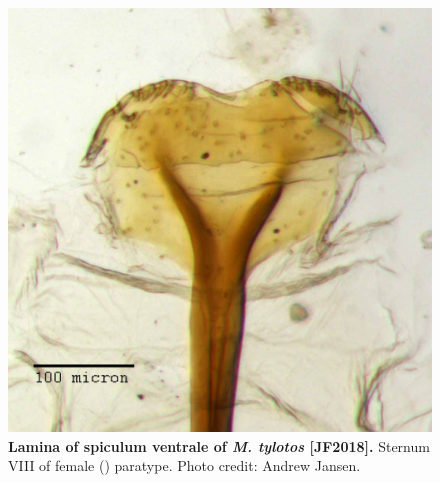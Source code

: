 \documentclass[fleqn,10pt,lineno]{wlpeerj} %
\begin{document}
\begin{figure}[h]
	\centering
	\includegraphics[width=\textwidth]{figure36.jpg}
	\caption{\textbf{Lamina of spiculum ventrale of \textit{M. tylotos} [JF2018].} Sternum VIII of female (\female) paratype. Photo credit: Andrew Jansen.}
	\label{fig:tylotos_lamina}
\end{figure}
\end{document}
